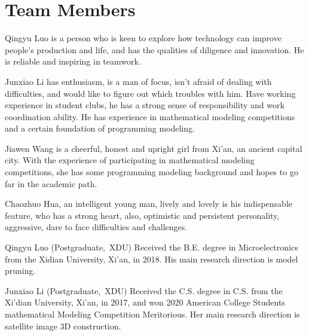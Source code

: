 \documentclass[journal]{IEEEtran}
\begin{document}
\section{Team Members}

Qingyu Luo is a person who is keen to explore how technology can improve people's production and life, and has the qualities of diligence and innovation. He is reliable and inspiring in teamwork.

Junxiao Li has enthusiasm, is a man of focus, isn't afraid of dealing with difficulties, and would like to figure out which troubles with him. %
Have working experience in student clubs, he has a strong sense of responsibility and work coordination ability. 
He has experience in mathematical modeling competitions and a certain foundation of programming modeling.

Jiawen Wang is a cheerful, honest and upright girl from Xi'an, an ancient capital city. With the experience of participating in mathematical modeling competitions, she has some programming modeling background and hopes to go far in the academic path.

Chaozhuo Hua, an intelligent young man, lively and lovely is his indispensable feature, who has a strong heart, also, optimistic and persistent personality, aggressive, dare to face difficulties and challenges.


\small



\begin{IEEEbiography}{Qingyu Luo}
(Postgraduate,~XDU) Received the B.E. degree in Microelectronics from the Xidian University, Xi'an, in 2018. His main research direction is model pruning.

\end{IEEEbiography}


 \begin{IEEEbiography}{Junxiao Li}
(Postgraduate,~XDU) Received the
C.S. degree in C.S. from the Xi'dian University, Xi'an, in 2017, and won 2020
American College Students mathematical Modeling
Competition Meritorious. Her main research direction is satellite image 3D construction.
\end{IEEEbiography}
\end{document}
